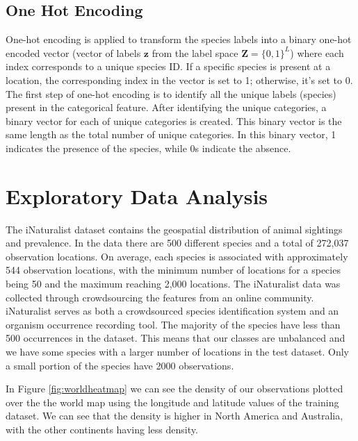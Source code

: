 \documentclass{article}
\begin{document}
\subsection{One Hot Encoding} One-hot encoding is applied to transform the species labels into a binary one-hot encoded vector (vector of labels $\mathbf{z}$ from the label space $\mathbf{Z} = \{0, 1\}^L$) where each index corresponds to a unique species ID. If a specific species is present at a location, the corresponding index in the vector is set to 1; otherwise, it's set to 0. The first step of one-hot encoding is to identify all the unique labels (species) present in the categorical feature.  After identifying the unique categories, a binary vector for each of unique categories is created. This binary vector is the same length as the total number of unique categories. In this binary vector, 1 indicates the presence of the species, while 0s indicate the absence. 

\section{Exploratory Data Analysis}

The iNaturalist dataset contains the geospatial distribution of animal sightings and prevalence. In the data there are 500 different species and a total of 272,037 observation locations. On average, each species is associated with approximately 544 observation locations, with the minimum number of locations for a species being 50 and the maximum reaching 2,000 locations. The iNaturalist data was collected through crowdsourcing the features from an online community. iNaturalist serves as both a crowdsourced species identification system and an organism occurrence recording tool. The majority of the species have less than 500 occurrences in the dataset. This means that our classes are unbalanced and we have some species with a larger number of locations in the test dataset. Only a small portion of the species have 2000 observations.

In Figure \ref{fig:worldheatmap} we can see the density of our observations plotted over the the world map using the longitude and latitude values of the training dataset. We can see that the density is higher in North America and Australia, with the other continents having less density. 

\end{document}
